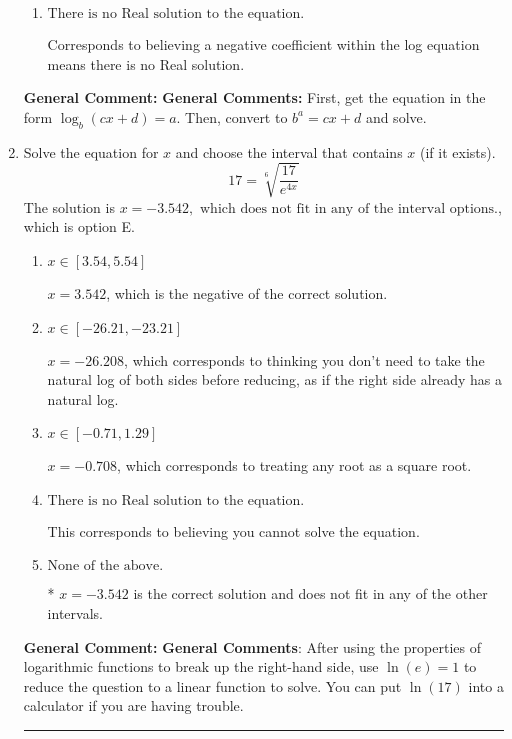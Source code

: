 \documentclass{extbook}[14pt]
\newcommand{\litem}[1]{\item #1

\rule{\textwidth}{0.4pt}}
\begin{document}
\begin{enumerate}
{\begin{enumerate}[label=\Alph*.]
$x = -1.500$, which corresponds to reversing the base and exponent when converting and reversing the value with $x$.
\item \( \text{There is no Real solution to the equation.} \)

Corresponds to believing a negative coefficient within the log equation means there is no Real solution.
\end{enumerate}

\textbf{General Comment:} \textbf{General Comments:} First, get the equation in the form $\log_b{(cx+d)} = a$. Then, convert to $b^a = cx+d$ and solve.
}
\litem{
 Solve the equation for $x$ and choose the interval that contains $x$ (if it exists).
\[  17 = \sqrt[6]{\frac{17}{e^{4x}}} \]The solution is \( x = -3.542, \text{ which does not fit in any of the interval options.} \), which is option E.\begin{enumerate}[label=\Alph*.]
\item \( x \in [3.54, 5.54] \)

$x = 3.542$, which is the negative of the correct solution.
\item \( x \in [-26.21, -23.21] \)

$x = -26.208$, which corresponds to thinking you don't need to take the natural log of both sides before reducing, as if the right side already has a natural log.
\item \( x \in [-0.71, 1.29] \)

$x = -0.708$, which corresponds to treating any root as a square root.
\item \( \text{There is no Real solution to the equation.} \)

This corresponds to believing you cannot solve the equation.
\item \( \text{None of the above.} \)

* $x = -3.542$ is the correct solution and does not fit in any of the other intervals.
\end{enumerate}

\textbf{General Comment:} \textbf{General Comments}: After using the properties of logarithmic functions to break up the right-hand side, use $\ln(e) = 1$ to reduce the question to a linear function to solve. You can put $\ln(17)$ into a calculator if you are having trouble.
}
\end{enumerate}
\end{document}
